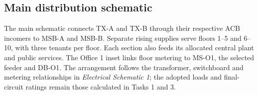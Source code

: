 \subsection*{Main distribution schematic}
The main schematic connects TX-A and TX-B through their respective ACB incomers to MSB-A and MSB-B. Separate rising supplies serve floors 1--5 and 6--10, with three tenants per floor. Each section also feeds its allocated central plant and public services. The Office 1 inset links floor metering to MS-O1, the selected feeder and DB-O1. The arrangement follows the transformer, switchboard and metering relationships in \emph{Electrical Schematic 1}; the adopted loads and final-circuit ratings remain those calculated in Tasks 1 and 3.
